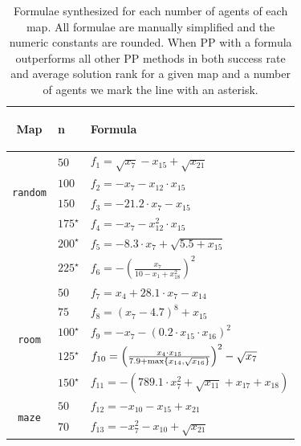 \documentclass[letterpaper]{article}
\renewcommand{\max}{\operatornamewithlimits{max}\limits}
\begin{document}
\begin{table}[t!]
\caption{Formulae synthesized for each number of agents of each map. All formulae are manually simplified and the numeric constants are rounded. When PP with a formula outperforms all other PP methods in both success rate and average solution rank for a given map and a number of agents we mark the line with an asterisk.}
\label{tab:all_maps_synth_results}
\centering
{\small
\begin{adjustbox}{width=0.09\columnwidth}
\begin{tabular}{c|l|l}
\toprule
\begin{turn}{90} \textbf{Map} \end{turn} & \textbf{n} & \textbf{Formula} \\
\midrule
\multirow{4}{*}{\begin{turn}{90} {\tt random} \end{turn}}
& $ 50 $ & $ f_{1} = \sqrt{x_{7}} - x_{15} + \sqrt{x_{21}} $ \\
& $ 100 $ & $ f_{2} = - x_{7} - x_{12} \cdot x_{15} $ \\
& $ 150 $ & $ f_{3} = - 21.2 \cdot x_{7} - x_{15} $ \\
& $ 175^\star $ & $ f_{4} = -x_{7} - x_{12}^2 \cdot x_{15} $ \\
& $ 200^\star $ & $ f_{5} = - 8.3 \cdot x_{7} + \sqrt{5.5 + x_{15}} $ \\
& $ 225^\star $ & $ f_{6} = -\left(\frac{x_{7}}{10 - x_{1} + x_{18}^2}\right)^2 $ \\
\hline
\multirow{5}{*}{\begin{turn}{90} {\tt room} \end{turn}}
& $ 50 $ & $ f_{7} = x_{4} + 28.1 \cdot x_{7} - x_{14} $ \\
& $ 75 $ & $ f_{8} = \left(x_{7} - 4.7\right)^8 + x_{15} $ \\
& $ 100^\star $ & $ f_{9} = - x_{7} - \left(0.2 \cdot x_{15} \cdot x_{16}\right)^2 $ \\
& $ 125^\star $ & $ f_{10} = \left(\frac{x_{4} \cdot x_{15}}{7.9 + \max\left\{x_{14}, \sqrt{x_{16}}\right\}}\right)^2 -\sqrt{x_{7}} $ \\
& $ 150^\star $ & $ f_{11} = -(789.1 \cdot x_{7}^2 + \sqrt{x_{11}} + x_{17} + x_{18}) $ \\
\hline
\multirow{5}{*}{\begin{turn}{90} {\tt maze} \end{turn}}
& $ 50 $ & $ f_{12} = - x_{10}- x_{15} + x_{21} $ \\
& $ 70 $ & $ f_{13} = - x_{7}^2 - x_{10} + \sqrt{x_{21}} $ \\

\end{tabular}
\end{adjustbox}}
\end{table}
\end{document}
